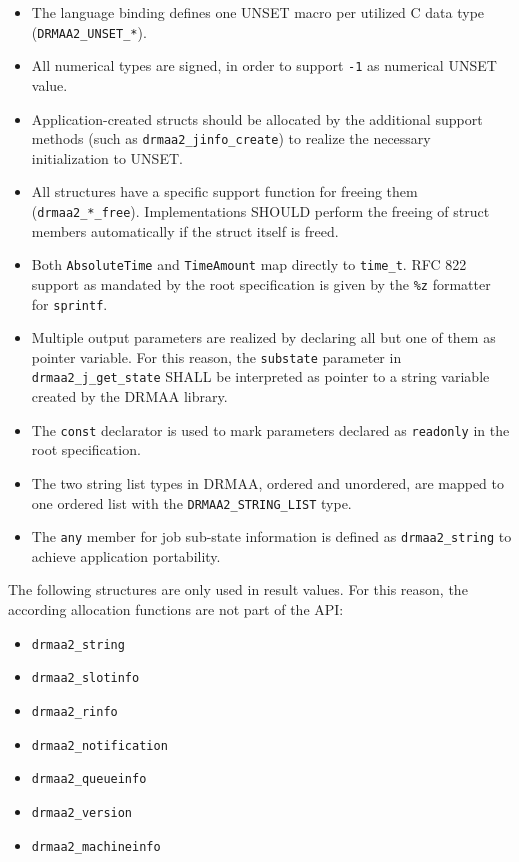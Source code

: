 \documentclass{article}
\newcommand{\h}[1]{\texttt{#1}}
\newcommand{\rat}[1]{}
\begin{document}
\begin{itemize}
\item The language binding defines one UNSET macro per utilized C data type (\h{DRMAA2\_UNSET\_*}). \rat{For UNSET values, the language binding adheres mainly to typical language conventions and not to GLUE as mandated in the root spec.}  
\item  All numerical types are signed, in order to support \h{-1} as numerical UNSET value.
\item  Application-created structs should be allocated by the additional support methods (such as \h{drmaa2\_jinfo\_create}) to realize the necessary initialization to UNSET. 
\item All structures have a specific support function for freeing them (\h{drmaa2\_*\_free}). Implementations SHOULD perform the freeing of struct members automatically if the struct itself is freed. \rat{The deallocation functions are needed to make sure that the allocating entity (the library) also performs the freeing operation. This is needed for cases where the DRMAA library is compiled with a different heap allocator than the DRMAA-based application. It is mainly a problem with Windows-based implementations.}
\item Both \h{AbsoluteTime} and \h{TimeAmount} map directly to \h{time\_t}. RFC 822 support as mandated by the root specification is given by the \h{\%z} formatter for \h{sprintf}.
\item Multiple output parameters are realized by declaring all but one of them as pointer variable. For this reason, the \h{substate} parameter in \h{drmaa2\_j\_get\_state} SHALL be interpreted as pointer to a string variable created by the DRMAA library. 
\item The \h{const} declarator is used to mark parameters declared as \h{readonly} in the root specification.
\item The two string list types in DRMAA, ordered and unordered, are mapped to one ordered list with the \h{DRMAA2\_STRING\_LIST} type.
\item The \h{any} member for job sub-state information is defined as \h{drmaa2\_string} to achieve application portability. 
\end{itemize}

The following structures are only used in result values. For this reason, the according allocation functions are not part of the API:

\begin{itemize}
\item \h{drmaa2\_string}
\item \h{drmaa2\_slotinfo}
\item \h{drmaa2\_rinfo}
\item \h{drmaa2\_notification}
\item \h{drmaa2\_queueinfo}
\item \h{drmaa2\_version}
\item \h{drmaa2\_machineinfo}
\end{itemize}
\end{document}
